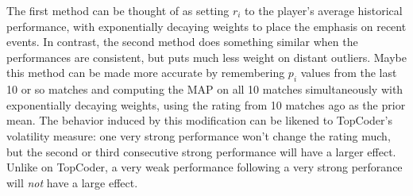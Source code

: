\documentclass{article}
\begin{document}
The first method can be thought of as setting $r_i$ to the player's average historical performance, with exponentially decaying weights to place the emphasis on recent events. In contrast, the second method does something similar when the performances are consistent, but puts much less weight on distant outliers. Maybe this method can be made more accurate by remembering $p_i$ values from the last 10 or so matches and computing the MAP on all 10 matches simultaneously with exponentially decaying weights, using the rating from 10 matches ago as the prior mean. The behavior induced by this modification can be likened to TopCoder's volatility measure: one very strong performance won't change the rating much, but the second or third consecutive strong performance will have a larger effect. Unlike on TopCoder, a very weak performance following a very strong perforance will \emph{not} have a large effect.
\end{document}

